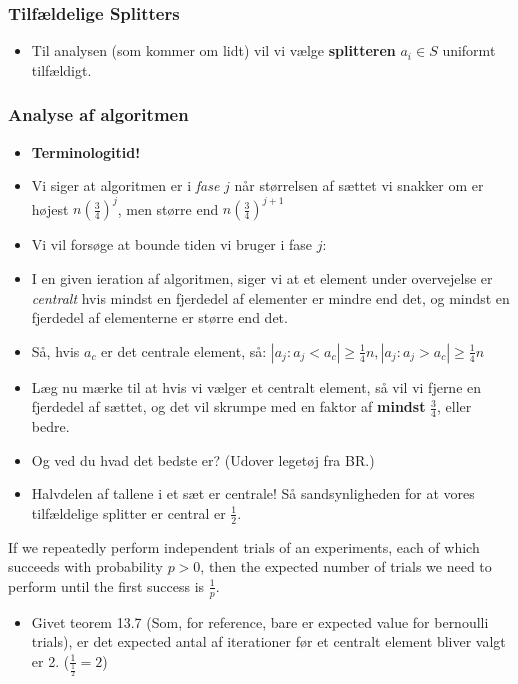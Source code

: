 \documentclass{beamer}
\begin{document}
\begin{frame}
  \frametitle{Tilfældelige Splitters}
  \begin{itemize}
  \item Til analysen (som kommer om lidt) vil vi vælge \textbf{splitteren} $a_{i} \in S$ uniformt tilfældigt.
  \end{itemize}
\end{frame}

\begin{frame}[allowframebreaks]
  \frametitle{Analyse af algoritmen}
 \begin{itemize}
 \item \textbf{Terminologitid!}
 \item Vi siger at algoritmen er i \textit{fase }$j$ når størrelsen af sættet vi snakker om er højest $n \left( \frac{3}{4} \right)^{j}$, men større end $n \left( \frac{3}{4} \right)^{j+1}$
 \item Vi vil forsøge at bounde tiden vi bruger i fase $j$: 
 \item I en given ieration af algoritmen, siger vi at et element under overvejelse er \textit{centralt}  hvis mindst en fjerdedel af elementer er mindre end det, og mindst en fjerdedel af elementerne er større end det. 
 \item Så, hvis $a_{c}$ er det centrale element, så: $|a_{j} : a_{j} < a_{c}| \geq \frac{1}{4}n, |a_{j} : a_{j} > a_{c}| \geq \frac{1}{4}n$
 \item Læg nu mærke til at hvis vi vælger et centralt element, så vil vi fjerne en fjerdedel af sættet, og det vil skrumpe med en faktor af \textbf{mindst} $\frac{3}{4}$, eller bedre. 
 \item Og ved du hvad det bedste er? (Udover legetøj fra BR.) 
 \item Halvdelen af tallene i et sæt er centrale! Så sandsynligheden for at vores tilfældelige splitter er central er $\frac{1}{2}$.
\end{itemize}
\begin{theorem}[13.7]
If we repeatedly perform independent trials of an experiments, each of which succeeds with probability $p > 0$, then the expected number of trials we need to perform until the first success is $\frac{1}{p}$.
\end{theorem}
\begin{itemize}
\item Givet teorem 13.7 (Som, for reference, bare er expected value for bernoulli trials), er det expected antal af iterationer før et centralt element bliver valgt er 2. ($\frac{1}{\frac{1}{2}} = 2$)

\end{itemize}
\end{frame}
\end{document}
